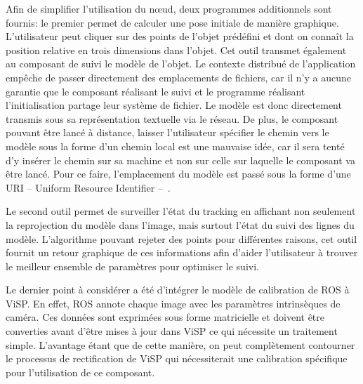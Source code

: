 Afin de simplifier l'utilisation du n\oe ud, deux programmes
additionnels sont fournis: le premier permet de calculer une pose
initiale de manière graphique. L'utilisateur peut cliquer sur des
points de l'objet prédéfini et dont on connaît la position relative en
trois dimensions dans l'objet. Cet outil transmet également au
composant de suivi le modèle de l'objet. Le contexte distribué de
l'application empêche de passer directement des emplacements de
fichiers, car il n'y a aucune garantie que le composant réalisant le
suivi et le programme réalisant l'initialisation partage leur système
de fichier. Le modèle est donc directement transmis sous sa
représentation textuelle via le réseau. De plus, le composant pouvant
être lancé à distance, laisser l'utilisateur spécifier le chemin vers
le modèle sous la forme d'un chemin local est une mauvaise idée, car
il sera tenté d'y insérer le chemin sur sa machine et non sur celle
sur laquelle le composant va être lancé. Pour ce faire, l'emplacement
du modèle est passé sous la forme d'une URI -- Uniform Resource
Identifier -- \citep{rfc2396}.


Le second outil permet de surveiller l'état du tracking en affichant
non seulement la reprojection du modèle dans l'image, mais surtout
l'état du suivi des lignes du modèle. L'algorithme pouvant rejeter des
points pour différentes raisons, cet outil fournit un retour graphique
de ces informations afin d'aider l'utilisateur à trouver le meilleur
ensemble de paramètres pour optimiser le suivi.


Le dernier point à considérer a été d'intégrer le modèle de
calibration de ROS à ViSP. En effet, ROS annote chaque
image avec les paramètres intrinsèques de caméra. Ces données sont exprimées sous forme
matricielle et doivent être converties avant d'être mises à jour dans
ViSP ce qui nécessite un traitement simple. L'avantage étant que de
cette manière, on peut complètement contourner le processus de
rectification de ViSP qui nécessiterait une calibration spécifique
pour l'utilisation de ce composant.


